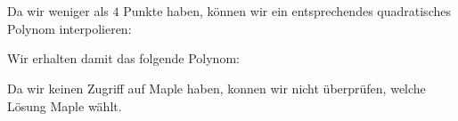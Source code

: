 \section{}

Da wir weniger als $4$ Punkte haben, können wir ein entsprechendes quadratisches Polynom interpolieren:



Wir erhalten damit das folgende Polynom:


Da wir keinen Zugriff auf Maple haben, konnen wir nicht überprüfen, welche Lösung Maple wählt.
